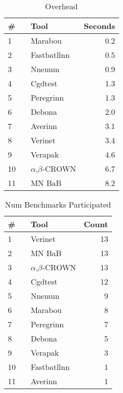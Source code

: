 


\begin{table}[h]
\begin{center}
\caption{Overhead} \label{tab:overhead}
{\setlength{\tabcolsep}{2pt}
\begin{tabular}[h]{@{}llr@{}}
\toprule
\textbf{\# ~} & \textbf{Tool} & \textbf{Seconds}\\
\midrule
1 & Marabou & 0.2 \\
2 & Fastbatllnn & 0.5 \\
3 & Nnenum & 0.9 \\
4 & Cgdtest & 1.3 \\
5 & Peregrinn & 1.3 \\
6 & Debona & 2.0 \\
7 & Averinn & 3.1 \\
8 & Verinet & 3.4 \\
9 & Verapak & 4.6 \\
10 & $\alpha$,$\beta$-CROWN & 6.7 \\
11 & MN BaB & 8.2 \\
\bottomrule
\end{tabular}
}
\end{center}
\end{table}




\begin{table}[h]
\begin{center}
\caption{Num Benchmarks Participated} \label{tab:stats0}
{\setlength{\tabcolsep}{2pt}
\begin{tabular}[h]{@{}llr@{}}
\toprule
\textbf{\# ~} & \textbf{Tool} & \textbf{Count}\\
\midrule
1 & Verinet & 13 \\
2 & MN BaB & 13 \\
3 & $\alpha$,$\beta$-CROWN & 13 \\
4 & Cgdtest & 12 \\
5 & Nnenum & 9 \\
6 & Marabou & 8 \\
7 & Peregrinn & 7 \\
8 & Debona & 5 \\
9 & Verapak & 3 \\
10 & Fastbatllnn & 1 \\
11 & Averinn & 1 \\
\bottomrule
\end{tabular}
}
\end{center}
\end{table}



